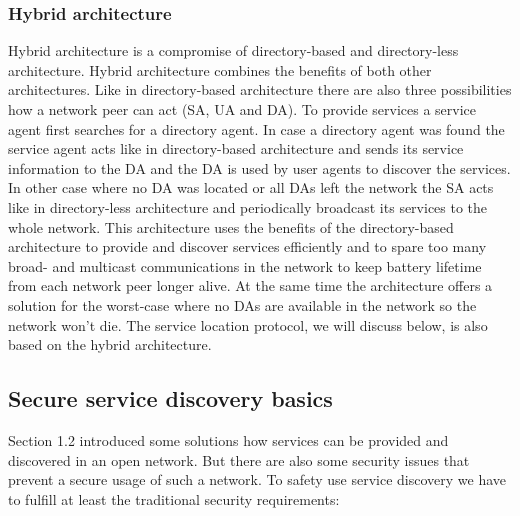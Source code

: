 \subsubsection{Hybrid architecture}
Hybrid architecture is a compromise of directory-based and directory-less architecture. Hybrid architecture combines the benefits of both other architectures. Like in directory-based architecture there are also three possibilities how a network peer can act (SA, UA and DA). To provide services a service agent first searches for a directory agent. In case a directory agent was found the service agent acts like in directory-based architecture and sends its service information to the DA and the DA is used by user agents to discover the services. In other case where no DA was located or all DAs left the network the SA acts like in directory-less architecture and periodically broadcast its services to the whole network. This architecture uses the benefits of the directory-based architecture to provide and discover services efficiently and to spare too many broad- and multicast communications in the network to keep battery lifetime from each network peer longer alive. At the same time the architecture offers a solution for the worst-case where no DAs are available in the network so the network won't die. The service location protocol, we will discuss below, is also based on the hybrid architecture.

\subsection{Secure service discovery basics}
Section 1.2 introduced some solutions how services can be provided and discovered in an open network. But there are also some security issues that prevent a secure usage of such a network. To safety use service discovery we have to fulfill at least the traditional security requirements:

